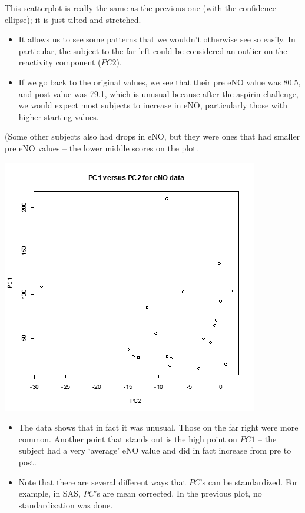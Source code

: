 \documentclass[
  9pt,
  ignorenonframetext,
]{beamer}
\providecommand{\tightlist}{%
  \setlength{\itemsep}{0pt}\setlength{\parskip}{0pt}}
\begin{document}
\begin{frame}{}
\protect\hypertarget{section-10}{}
This scatterplot is really the same as the previous one (with the
confidence ellipse); it is just tilted and stretched.

\begin{itemize}
\tightlist
\item
  It allows us to see some patterns that we wouldn't otherwise see so
  easily. In particular, the subject to the far left could be considered
  an outlier on the reactivity component (\(PC2\)).
\item
  If we go back to the original values, we see that their pre eNO value
  was 80.5, and post value was 79.1, which is unusual because after the
  aspirin challenge, we would expect most subjects to increase in eNO,
  particularly those with higher starting values.
\end{itemize}

\tiny

(Some other subjects also had drops in eNO, but they were ones that had
smaller pre eNO values -- the lower middle scores on the plot.

\tiny

\begin{center}\includegraphics[width=0.5\linewidth]{figs_L2/L2-f20} \end{center}

\tiny
\end{frame}

\begin{frame}{}
\protect\hypertarget{section-11}{}
\begin{itemize}
\tightlist
\item
  The data shows that in fact it was unusual. Those on the far right
  were more common. Another point that stands out is the high point on
  \(PC1\) -- the subject had a very `average' eNO value and did in fact
  increase from pre to post.\\
\item
  Note that there are several different ways that \(PC\)'s can be
  standardized. For example, in SAS, \(PC\)'s are mean corrected. In the
  previous plot, no standardization was done.
\end{itemize}
\end{frame}
\end{document}
